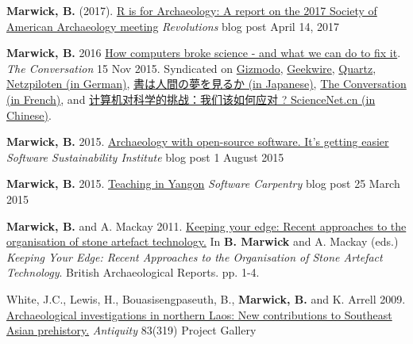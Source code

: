 \documentclass[11pt,article,oneside]{memoir}
\begin{document}
{{{\ind \textbf{Marwick, B.} (2017). \href{http://blog.revolutionanalytics.com/2017/04/r-is-for-archaeology.html}{R is for Archaeology: A report on the 2017 Society of American Archaeology meeting} \textit{Revolutions} blog post April 14, 2017 

\ind \textbf{Marwick, B.} 2016 \href{https://theconversation.com/how-computers-broke-science-and-what-we-can-do-to-fix-it-49938}{How computers broke science - and what we can do to fix it}. \textit{The Conversation} 15 Nov 2015.  Syndicated on \href{http://gizmodo.com/how-computers-broke-science-and-what-we-can-do-to-fix-i-1741649207}{Gizmodo}, \href{http://www.geekwire.com/2015/how-computers-broke-science-and-what-we-can-do-to-fix-it/}{Geekwire}, \href{http://qz.com/548730/computers-are-making-science-extremely-challenging-for-scientists/}{Quartz}, \href{http://www.netzpiloten.de/wissenschaft-computer-reproduzierbarkeit-probleme/}{Netzpiloten (in German)}, \href{http://filled-with-deities.hatenablog.jp/entry/2015/11/17/202013}{書は人間の夢を見るか (in Japanese)}, \href{https://theconversation.com/les-ordinateurs-nuisent-gravement-a-la-science-mais-il-est-possible-dy-remedier-1-52024}{The Conversation (in French)}, and \href{http://news.sciencenet.cn/htmlnews/2017/8/385497.shtm}{计算机对科学的挑战：我们该如何应对 ? ScienceNet.cn (in Chinese)}.

\ind \textbf{Marwick, B.} 2015. \href{https://www.software.ac.uk/blog/2016-09-26-archaeology-open-source-software-its-getting-easier}{Archaeology with open-source software. It's getting easier} \textit{Software Sustainability Institute} blog post 1 August 2015 

\ind \textbf{Marwick, B.} 2015. \href{https://software-carpentry.org/blog/2015/03/teaching-in-yangon.html}{Teaching in Yangon} \textit{Software Carpentry} blog post 25 March 2015 

\ind \textbf{Marwick, B.} and A. Mackay 2011. \href{http://faculty.washington.edu/bmarwick/PDFs/Marwick_and_Mackay_2011_intro.pdf}{Keeping your edge: Recent approaches to the organisation of stone artefact technology.} In \textbf{B. Marwick} and A. Mackay (eds.) \textit{Keeping Your Edge: Recent Approaches to the Organisation of Stone Artefact Technology}. British Archaeological Reports.  pp. 1-4.

\ind White, J.C., Lewis, H., Bouasisengpaseuth, B., \textbf{Marwick, B.} and K. Arrell 2009. \href{http://faculty.washington.edu/bmarwick/PDFs/White_et_al_2009_Antiquity.pdf}{Archaeological investigations in northern Laos: New contributions to Southeast Asian prehistory.} \textit{Antiquity} 83(319) Project Gallery

}}}
\end{document}
